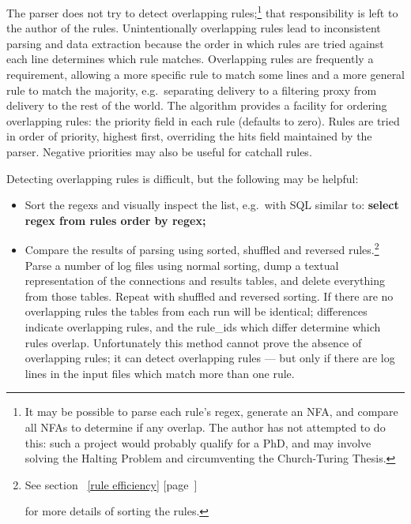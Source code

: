 \documentclass[a4paper,12pt,draft]{article}
\newcommand{\refwithpage}[1]{%
    \empty{}\ref{#1} [page~\pageref{#1}]%
}
\begin{document}
The parser does not try to detect overlapping rules;\footnote{It may be
possible to parse each rule's regex, generate an NFA, and compare all NFAs
to determine if any overlap.  The author has not attempted to do this: such
a project would probably qualify for a PhD, and may involve solving the
Halting Problem and circumventing the Church-Turing Thesis.} that
responsibility is left to the author of the rules.  Unintentionally
overlapping rules lead to inconsistent parsing and data extraction because
the order in which rules are tried against each line determines which rule
matches.  Overlapping rules are frequently a requirement, allowing a more
specific rule to match some lines and a more general rule to match the
majority, e.g.\ separating \SMTP{} delivery to a filtering proxy from
\SMTP{} delivery to the rest of the world.  The algorithm provides a
facility for ordering overlapping rules: the priority field in each rule
(defaults to zero).  Rules are tried in order of priority, highest first,
overriding the hits field maintained by the parser.  Negative priorities
may also be useful for catchall rules.

Detecting overlapping rules is difficult, but the following may be helpful:

\begin{itemize}

    \item Sort the regexs and visually inspect the list, e.g.\ with SQL
        similar to: \textbf{select regex from rules order by regex;}

    \item Compare the results of parsing using sorted, shuffled and
        reversed rules.\footnote{See section~\refwithpage{rule efficiency}
        for more details of sorting the rules.}  Parse a number of log
        files using normal sorting, dump a textual representation of the
        connections and results tables, and delete everything from those
        tables.  Repeat with shuffled and reversed sorting.  If there are
        no overlapping rules the tables from each run will be identical;
        differences indicate overlapping rules, and the rule\_ids which
        differ determine which rules overlap.  Unfortunately this method
        cannot prove the absence of overlapping rules; it can detect
        overlapping rules --- but only if there are log lines in the input
        files which match more than one rule.

\end{itemize}
\end{document}
